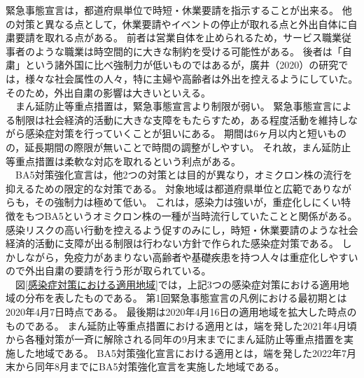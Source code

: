 \documentclass[paper={210mm,297mm},line_length=35zw,number_of_lines=31,head_space=30mm,gutter=40mm,baselineskip=2.0zw,headfoot_verticalposition=1.5zw]{jlreq}
\begin{document}
緊急事態宣言は，都道府県単位で時短・休業要請を指示することが出来る。
他の対策と異なる点として，休業要請やイベントの停止が取れる点と外出自体に自粛要請を取れる点がある。
前者は営業自体を止められるため，サービス職業従事者のような職業は時空間的に大きな制約を受ける可能性がある。
後者は「自粛」という諸外国に比べ強制力が低いものではあるが，廣井（2020）の研究では，様々な社会属性の人々，特に主婦や高齢者は外出を控えるようにしていた。
そのため，外出自粛の影響は大きいといえる。\\
　まん延防止等重点措置は，緊急事態宣言より制限が弱い。
緊急事態宣言による制限は社会経済的活動に大きな支障をもたらすため，ある程度活動を維持しながら感染症対策を行っていくことが狙いにある。
期間は6ヶ月以内と短いものの，延長期間の際限が無いことで時間の調整がしやすい。
それ故，まん延防止等重点措置は柔軟な対応を取れるという利点がある。\\
　BA5対策強化宣言は，他2つの対策とは目的が異なり，オミクロン株の流行を抑えるための限定的な対策である。
対象地域は都道府県単位と広範でありながらも，その強制力は極めて低い。
これは，感染力は強いが，重症化しにくい特徴をもつBA5というオミクロン株の一種が当時流行していたことと関係がある。
感染リスクの高い行動を控えるよう促すのみにし，時短・休業要請のような社会経済的活動に支障が出る制限は行わない方針で作られた感染症対策である。
しかしながら，免疫力があまりない高齢者や基礎疾患を持つ人々は重症化しやすいので外出自粛の要請を行う形が取られている。\\
　図\ref{感染症対策における適用地域}では，上記3つの感染症対策における適用地域の分布を表したものである。
第1回緊急事態宣言の凡例における最初期とは2020年4月7日時点である。
最後期は2020年4月16日の適用地域を拡大した時点のものである。
まん延防止等重点措置における適用とは，端を発した2021年4月頃から各種対策が一斉に解除される同年の9月末までにまん延防止等重点措置を実施した地域である。
BA5対策強化宣言における適用とは，端を発した2022年7月末から同年8月までにBA5対策強化宣言を実施した地域である。\\
\end{document}
